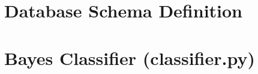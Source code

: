 \newpage \appendix \appendixpage \addappheadtotoc
\section{Database Schema Definition}
\label{appendix:a}


\section{\Naive Bayes Classifier (classifier.py)}
\label{appendix:b}
